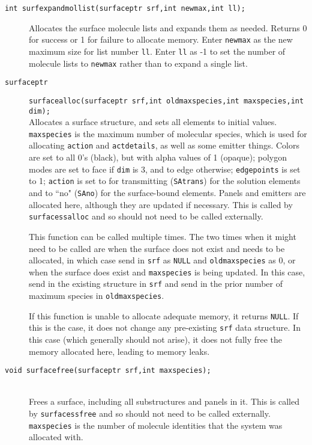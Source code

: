 \documentclass {book}
\begin{document}
\begin{description}
\item[\texttt{int surfexpandmollist(surfaceptr srf,int newmax,int ll);}]
\hfill
Allocates the surface molecule lists and expands them as needed. Returns 0 for success or 1 for failure to allocate memory. Enter \texttt{newmax} as the new maximum size for list number \texttt{ll}. Enter \texttt{ll} as -1 to set the number of molecule lists to \texttt{newmax} rather than to expand a single list.

\item[\texttt{surfaceptr}]
\texttt{surfacealloc(surfaceptr srf,int oldmaxspecies,int maxspecies,int dim);}
\hfill \\
Allocates a surface structure, and sets all elements to initial values. \texttt{maxspecies} is the maximum number of molecular species, which is used for allocating \texttt{action} and \texttt{actdetails}, as well as some emitter things. Colors are set to all 0's (black), but with alpha values of 1 (opaque); polygon modes are set to face if \texttt{dim} is 3, and to edge otherwise; \texttt{edgepoints} is set to 1; \texttt{action} is set to for transmitting (\texttt{SAtrans}) for the solution elements and to ``no" (\texttt{SAno}) for the surface-bound elements. Panels and emitters are allocated here, although they are updated if necessary. This is called by \texttt{surfacessalloc} and so should not need to be called externally.

This function can be called multiple times. The two times when it might need to be called are when the surface does not exist and needs to be allocated, in which case send in \texttt{srf} as \texttt{NULL} and \texttt{oldmaxspecies} as 0, or when the surface does exist and \texttt{maxspecies} is being updated. In this case, send in the existing structure in \texttt{srf} and send in the prior number of maximum species in \texttt{oldmaxspecies}.

If this function is unable to allocate adequate memory, it returns \texttt{NULL}. If this is the case, it does not change any pre-existing \texttt{srf} data structure. In this case (which generally should not arise), it does not fully free the memory allocated here, leading to memory leaks.

\item[\texttt{void surfacefree(surfaceptr srf,int maxspecies);}]
\hfill \\
Frees a surface, including all substructures and panels in it. This is called by \texttt{surfacessfree} and so should not need to be called externally. \texttt{maxspecies} is the number of molecule identities that the system was allocated with.


\end{description}
\end{document}
